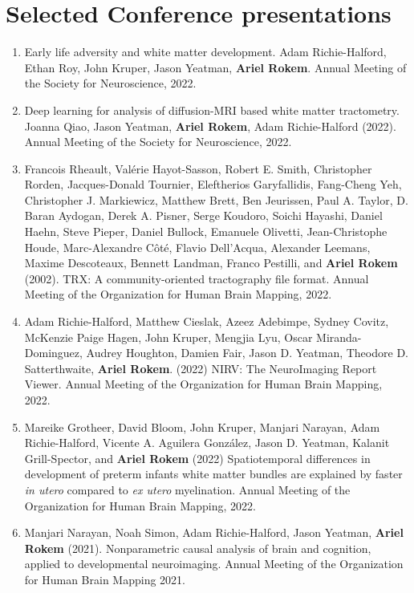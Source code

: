 \documentclass[11pt,fullpage]{article}
\begin{document}
\section*{Selected Conference presentations}
\begin{enumerate}

\item Early life adversity and white matter development. Adam Richie-Halford, Ethan Roy, John Kruper, Jason Yeatman, {\bf Ariel Rokem}. Annual Meeting of the Society for Neuroscience, 2022.

\item Deep learning for analysis of diffusion-MRI based white matter tractometry. Joanna Qiao, Jason Yeatman, {\bf Ariel Rokem}, Adam Richie-Halford (2022). Annual Meeting of the Society for Neuroscience, 2022.

\item Francois Rheault, Val\'{e}rie Hayot-Sasson, Robert E. Smith, Christopher Rorden, Jacques-Donald Tournier, Eleftherios Garyfallidis, Fang-Cheng Yeh, Christopher J. Markiewicz, Matthew Brett, Ben Jeurissen, Paul A. Taylor, D. Baran Aydogan, Derek A. Pisner, Serge Koudoro, Soichi Hayashi, Daniel Haehn, Steve Pieper, Daniel Bullock, Emanuele Olivetti, Jean-Christophe Houde, Marc-Alexandre C\^{o}t\'{e}, Flavio Dell’Acqua, Alexander Leemans, Maxime Descoteaux, Bennett Landman, Franco Pestilli, and {\bf Ariel Rokem} (2002). TRX: A community-oriented tractography file format. Annual Meeting of the Organization for Human Brain Mapping, 2022.

\item Adam Richie-Halford, Matthew Cieslak, Azeez Adebimpe, Sydney Covitz, McKenzie Paige Hagen, John Kruper, Mengjia Lyu, Oscar Miranda-Dominguez, Audrey Houghton, Damien Fair, Jason D. Yeatman, Theodore D. Satterthwaite, {\bf Ariel Rokem}. (2022) NIRV: The NeuroImaging Report Viewer. Annual Meeting of the Organization for Human Brain Mapping, 2022.

\item Mareike Grotheer, David Bloom, John Kruper, Manjari Narayan, Adam Richie-Halford, Vicente A. Aguilera González, Jason D. Yeatman, Kalanit Grill-Spector, and {\bf Ariel Rokem} (2022) Spatiotemporal differences in development of preterm infants white matter bundles are explained by faster \emph{in utero} compared to \emph{ex utero} myelination. Annual Meeting of the Organization for Human Brain Mapping, 2022.

\item Manjari Narayan, Noah Simon, Adam Richie-Halford, Jason Yeatman, {\bf Ariel Rokem} (2021). Nonparametric causal analysis of brain and cognition, applied to developmental neuroimaging. Annual Meeting of the Organization for Human Brain Mapping 2021.


\end{enumerate}
\end{document}

